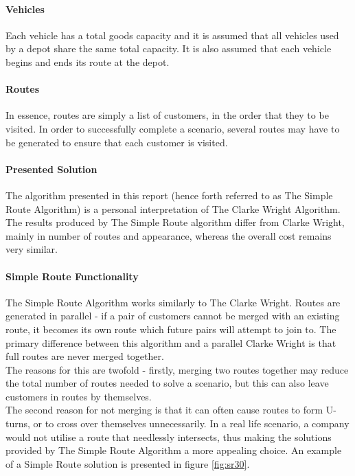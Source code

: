 \documentclass[conference]{acmsiggraph}
\begin{document}
		\paragraph{Vehicles}
		Each vehicle has a total goods capacity and it is assumed that all vehicles used by a depot share the same total capacity. It is also assumed that each vehicle begins and ends its route at the depot.
		
		\paragraph{Routes}
		In essence, routes are simply a list of customers, in the order that they to be visited. In order to successfully complete a scenario, several routes may have to be generated to ensure that each customer is visited.
				
		\paragraph{Presented Solution}
		The algorithm presented in this report (hence forth referred to as The Simple Route Algorithm) is a personal interpretation of The Clarke Wright Algorithm. The results produced by The Simple Route algorithm differ from Clarke Wright, mainly in number of routes and appearance, whereas the overall cost remains very similar.
		
		\paragraph{Simple Route Functionality}
		The Simple Route Algorithm works similarly to The Clarke Wright. Routes are generated in parallel - if a pair of customers cannot be merged with an existing route, it becomes its own route which future pairs will attempt to join to. The primary difference between this algorithm and a parallel Clarke Wright is that full routes are never merged together.\\
		The reasons for this are twofold - firstly, merging two routes together may reduce the total number of routes needed to solve a scenario, but this can also leave customers in routes by themselves.\\
		The second reason for not merging is that it can often cause routes to form U-turns, or to cross over themselves unnecessarily. In a real life scenario, a company would not utilise a route that needlessly intersects, thus making the solutions provided by The Simple Route Algorithm a more appealing choice. An example of a Simple Route solution is presented in figure \ref{fig:sr30}.
		
\end{document}
